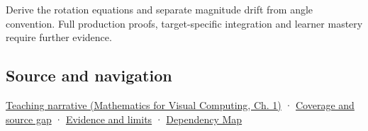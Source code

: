 Derive the rotation equations and separate magnitude drift from angle convention. Full production proofs, target-specific integration and learner mastery require further evidence.

\subsection{Source and navigation}\label{appendix-f77eadcc4a93-source-and-navigation}

\href{../02-Mathematics-for-Visual-Computing/main.pdf\#nameddest=01-foundations-i-ch017-rotation-first-becomes-understandable-in-a-plane}{Teaching narrative (Mathematics for Visual Computing, Ch. 1)} · \hyperref[appendix-fd090d982a15-phase-6---parts-501-600]{Coverage and source gap} · \hyperref[appendix-a103e7846d21-phase-6---source-analysis-and-verification]{Evidence and limits} · \hyperref[appendix-4ad47bdd269a]{Dependency Map}
